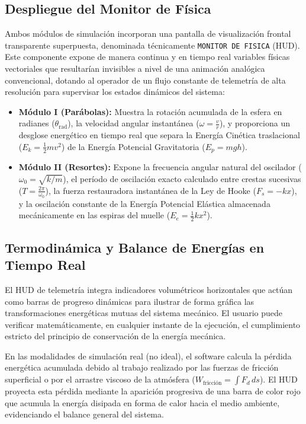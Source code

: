 \documentclass[11pt,a4paper]{article}
\begin{document}
	\subsection{Despliegue del Monitor de Física}
	Ambos módulos de simulación incorporan una pantalla de visualización frontal transparente superpuesta, denominada técnicamente \texttt{MONITOR DE FISICA} (HUD). Este componente expone de manera continua y en tiempo real variables físicas vectoriales que resultarían invisibles a nivel de una animación analógica convencional, dotando al operador de un flujo constante de telemetría de alta resolución para supervisar los estados dinámicos del sistema:
	\begin{itemize}
		\item \textbf{Módulo I (Parábolas):} Muestra la rotación acumulada de la esfera en radianes ($\theta_{\text{rad}}$), la velocidad angular instantánea ($\omega = \frac{v}{r}$), y proporciona un desglose energético en tiempo real que separa la Energía Cinética traslacional ($E_k = \frac{1}{2}mv^2$) de la Energía Potencial Gravitatoria ($E_p = mgh$).
		\item \textbf{Módulo II (Resortes):} Expone la frecuencia angular natural del oscilador ($\omega_0 = \sqrt{k/m}$), el período de oscilación exacto calculado entre crestas sucesivas ($T = \frac{2\pi}{\omega_0}$), la fuerza restauradora instantánea de la Ley de Hooke ($F_s = -kx$), y la oscilación constante de la Energía Potencial Elástica almacenada mecánicamente en las espiras del muelle ($E_e = \frac{1}{2}kx^2$).
	\end{itemize}
	
	\subsection{Termodinámica y Balance de Energías en Tiempo Real}
	El HUD de telemetría integra indicadores volumétricos horizontales que actúan como barras de progreso dinámicas para ilustrar de forma gráfica las transformaciones energéticas mutuas del sistema mecánico. El usuario puede verificar matemáticamente, en cualquier instante de la ejecución, el cumplimiento estricto del principio de conservación de la energía mecánica. 
	
	En las modalidades de simulación real (no ideal), el software calcula la pérdida energética acumulada debido al trabajo realizado por las fuerzas de fricción superficial o por el arrastre viscoso de la atmósfera ($W_{\text{fricción}} = \int F_d \, ds$). El HUD proyecta esta pérdida mediante la aparición progresiva de una barra de color rojo que acumula la energía disipada en forma de calor hacia el medio ambiente, evidenciando el balance general del sistema.
	
\end{document}
